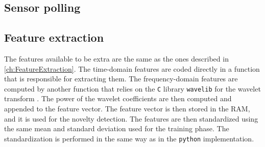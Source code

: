 \subsection{Sensor polling}
\writehereaboutinterrupts

\subsection{Feature extraction}
The features available to be extra are the same as the ones described in \autoref{ch:FeatureExtraction}. The time-domain features are coded directly in a function that is responsible for extracting them. The frequency-domain features are computed by another function that relies on the \texttt{C} library \texttt{wavelib} for the wavelet transform \cite{wavelib}. The power of the wavelet coefficients are then computed and appended to the feature vector. The feature vector is then stored in the RAM, and it is used for the novelty detection.
The features are then standardized using the same mean and standard deviation used for the training phase. The standardization is performed in the same way as in the \texttt{python} implementation.

